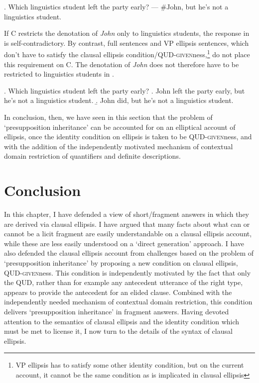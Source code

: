 \documentclass[doublespace]{umthesis}
\begin{document}
\ex. 	Which linguistics student left the party early? --- \#John, but he's not a linguistics student.

If C restricts the denotation of {\it John} only to linguistics students, the response in \Last is self-contradictory.
By contrast, full sentences and VP ellipsis sentences, which don't have to satisfy the clausal ellipsis condition/\textsc{QUD-given}ness,\footnote{VP ellipsis has to satisfy some other identity condition, but on the current account, it cannot be the same condition as is implicated in clausal ellipsis}
do not place this requirement on C.
The denotation of {\it John} does not therefore have to be restricted to linguistics students in \Next.

\ex. 	Which linguistics student left the party early?
	\a. John left the party early, but he's not a linguistics student.
	\b. John did, but he's not a linguistics student.
	
In conclusion, then, we have seen in this section that the problem of `presupposition inheritance' can be accounted for on an elliptical account of ellipsis, once the identity condition on ellipsis is taken to be \textsc{QUD-given}ness, and with the addition of the independently motivated mechanism of contextual domain restriction of quantifiers and definite descriptions.

\section{Conclusion}

In this chapter, I have defended a view of short/fragment answers in which they are derived via clausal ellipsis.
I have argued that many facts about what can or cannot be a licit fragment are easily understandable on a clausal ellipsis account, while these are less easily understood on a `direct generation' approach.
I have also defended the clausal ellipsis account from challenges based on the problem of `presupposition inheritance' by proposing a new condition on clausal ellipsis, \textsc{QUD-given}ness.
This condition is independently motivated by the fact that only the QUD, rather than for example any antecedent utterance of the right type, appears to provide the antecedent for an elided clause.
Combined with the independently needed mechanism of contextual domain restriction, this condition delivers `presupposition inheritance' in fragment answers.
Having devoted attention to the semantics of clausal ellipsis and the identity condition which must be met to license it, I now turn to the details of the syntax of clausal ellipsis.




\end{document}
